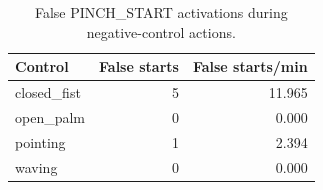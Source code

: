 \begin{table}[t]
\centering
\small
\caption{False PINCH\_START activations during negative-control actions.}
\label{tab:pinch_negative}
\begin{tabular}{lrr}
\hline
Control & False starts & False starts/min \\
\hline
closed\_fist & 5 & 11.965 \\
open\_palm & 0 & 0.000 \\
pointing & 1 & 2.394 \\
waving & 0 & 0.000 \\
\hline
\end{tabular}
\end{table}

